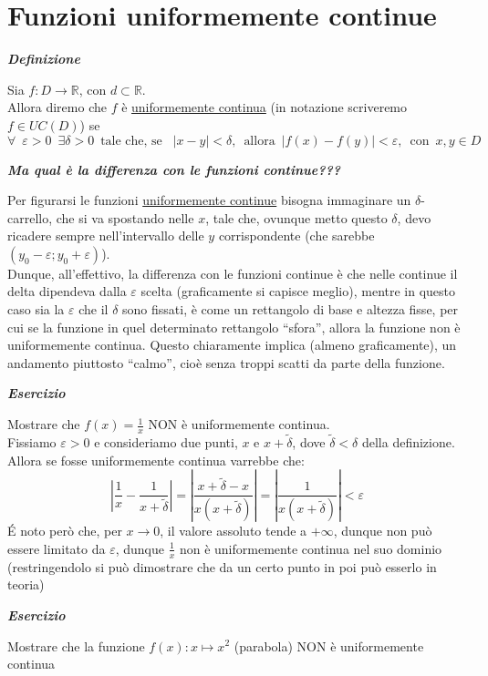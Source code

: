 \documentclass{article}
\theoremstyle{definition}
\newcommand{\virgolette}[1]{``#1''}
\begin{document}
\section{Funzioni uniformemente continue}
\begin{center}
    \textbf{\textit{Definizione}}
\end{center}
Sia $f: D \to \mathbb{R}$, con $d \subset \mathbb{R}$.
\\
Allora diremo che $f$ è \underline{uniformemente continua} (in notazione scriveremo $f \in UC(D)$) se
\begin{equation}
    \forall \,\,\, \varepsilon>0 \,\,\, \exists \delta>0 \,\,\, \mbox{tale che, se } \,\,\, |x-y|<\delta, \,\,\, \mbox{allora} \,\,\, |f(x)-f(y)|<\varepsilon, \,\,\, \mbox{con} \,\,\, x,y \in D
\end{equation}
\begin{center}
    \textbf{\textit{Ma qual è la differenza con le funzioni continue???}}
\end{center}
Per figurarsi le funzioni \underline{uniformemente continue} bisogna immaginare un $\delta$-carrello, che si va spostando nelle $x$, tale che, ovunque metto questo $\delta$, devo ricadere sempre nell'intervallo delle $y$ corrispondente (che sarebbe $(y_0-\varepsilon;y_0+\varepsilon)$).
\\
Dunque, all'effettivo, la differenza con le funzioni continue è che nelle continue il delta dipendeva dalla $\varepsilon$ scelta (graficamente si capisce meglio), mentre in questo caso sia la $\varepsilon$ che il $\delta$ sono fissati, è come un rettangolo di base e altezza fisse, per cui se la funzione in quel determinato rettangolo \virgolette{sfora}, allora la funzione non è uniformemente continua. Questo chiaramente implica (almeno graficamente), un andamento piuttosto \virgolette{calmo}, cioè senza troppi scatti da parte della funzione.
\begin{center}
    \textbf{\textit{Esercizio}}
\end{center}
Mostrare che $f(x)=\frac{1}{x}$ NON è uniformemente continua.
\\
Fissiamo $\varepsilon > 0$ e consideriamo due punti, $x$ e $x + \tilde{\delta}$, dove $\tilde{\delta} < \delta$ della definizione. Allora se fosse uniformemente continua varrebbe che:
\begin{equation}
    \left|\frac{1}{x}-\frac{1}{x+\tilde{\delta}}\right|=\left|\frac{x+\tilde{\delta}-x}{x(x + \tilde{\delta})}\right|=\left|\frac{1}{x(x + \tilde{\delta})}\right| < \varepsilon
\end{equation}
\'E noto però che, per $x \to 0$, il valore assoluto tende a $+\infty$, dunque non può essere limitato da $\varepsilon$, dunque $\frac{1}{x}$ non è uniformemente continua nel suo dominio (restringendolo si può dimostrare che da un certo punto in poi può esserlo in teoria)
\begin{center}
    \textbf{\textit{Esercizio}}
\end{center}
Mostrare che la funzione $f(x): x \mapsto x^2$ (parabola) NON è uniformemente continua
\end{document}
